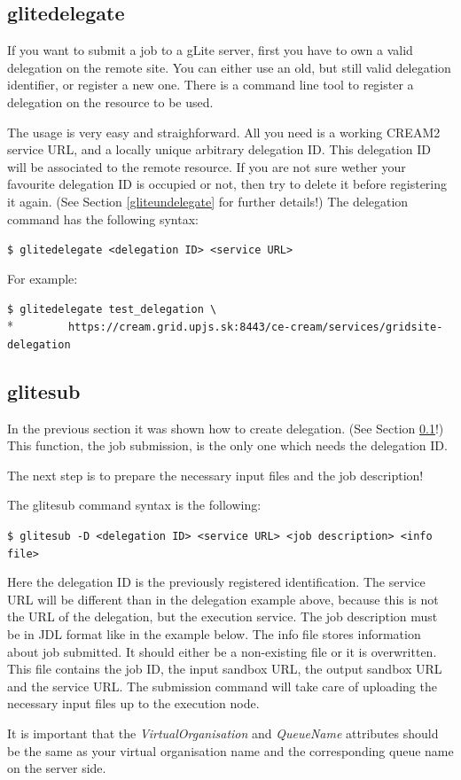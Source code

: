 \documentclass{article}
\begin{document}
\subsection{glitedelegate}
\label{glitedelegate}
If you want to submit a job to a gLite server, first you have to own a valid delegation on the remote site. You can either use an old, but still valid delegation identifier, or register a new one. There is a command line tool to register a delegation on the resource to be used.\par
The usage is very easy and straighforward. All you need is a working CREAM2 service URL, and a locally unique arbitrary delegation ID. This delegation ID will be associated to the remote resource. If you are not sure wether your favourite delegation ID is occupied or not, then try to delete it before registering it again. (See Section \ref{gliteundelegate} for further details!) The delegation command has the following syntax:
\begin{shaded}\verb#$ glitedelegate <delegation ID> <service URL>#\end{shaded}
For example:
\begin{shaded}\verb#$ glitedelegate test_delegation \#\\*
\verb#        https://cream.grid.upjs.sk:8443/ce-cream/services/gridsite-delegation#\end{shaded}
\subsection{glitesub}
\label{glitesub}
In the previous section it was shown how to create delegation. (See Section \ref{glitedelegate}!) This function, the job submission, is the only one which needs the delegation ID.\par The next step is to prepare the necessary input files and the job description!\par
The glitesub command syntax is the following:
\begin{shaded}\verb#$ glitesub -D <delegation ID> <service URL> <job description> <info file>#\end{shaded}
Here the delegation ID is the previously registered identification. The service URL will be different than in the delegation example above, because this is not the URL of the delegation, but the execution service. The job description must be in JDL format like in the example below. The info file stores information about job submitted. It should either be a non-existing file or it is overwritten. This file contains the job ID, the input sandbox URL, the output sandbox URL and the service URL. The submission command will take care of uploading the necessary input files up to the execution node.\par
It is important that the \textit{VirtualOrganisation} and \textit{QueueName} attributes should be the same as your virtual organisation name and the corresponding queue name on the server side.\par
\end{document}
